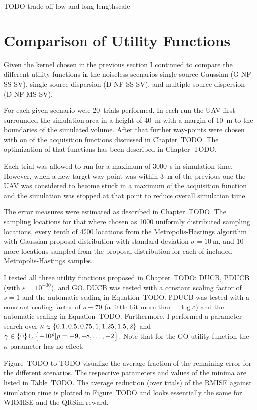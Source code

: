 \documentclass[11pt,a4paper,twoside,BCOR=15mm]{scrreprt}
\begin{document}
TODO trade-off low and long lengthscale

\section{Comparison of Utility Functions} \label{sec:cmputility}
Given the kernel chosen in the previous section I continued to compare the 
different utility functions in the noiseless scenarios single source Gaussian 
(G-NF-SS-SV), single source dispersion (D-NF-SS-SV), and multiple source 
dispersion (D-NF-MS-SV).

For each given scenario were 20~trials performed. In each run the UAV first 
surrounded the simulation area in a height of \SI{40}{\meter} with a margin of 
\SI{10}{\meter} to the boundaries of the simulated volume. After that further 
way-points were chosen with on of the acquisition functions discussed in 
Chapter~TODO\@. The optimization of that functions has been described in 
Chapter~TODO\@.

Each trial was allowed to run for a maximum of \SI{3000}{\second} in simulation 
time. However, when a new target way-point was within \SI{3}{\meter} of the 
previous one the UAV was considered to become stuck in a maximum of the 
acquisition function and the simulation was stopped at that point to reduce 
overall simulation time.

The error measures were estimated as described in Chapter~TODO\@. The sampling 
locations for that where chosen as 1000 uniformly distributed sampling 
locations, every tenth of 4200 locations from the Metropolis-Hastings algorithm 
with Gaussian proposal distribution with standard deviation $\sigma 
= \SI{10}{\meter}$, and 10 more locations sampled from the proposal distribution 
for each of included Metropolis-Hastings samples.

I tested all three utility functions proposed in Chapter~TODO\@: DUCB, PDUCB 
(with $\varepsilon = 10^{-30}$), and GO\@. DUCB was tested with a constant 
scaling factor of $s = 1$ and the automatic scaling in Equation~TODO\@. PDUCB 
was tested with a constant scaling factor of $s = 70$ (a little bit more than 
$-\log \varepsilon$) and the automatic scaling in Equation~TODO\@.  Furthermore, 
I performed a parameter search over $\kappa \in \cbr{0.1, 0.5, 
0.75, 1, 1.25, 1.5, 2}$ and $\gamma \in \cbr{0} \cup \cbr{-10^p | p = -9, -8, 
  \dots, -2}$. Note that for the GO utility function the $\kappa$ parameter has 
no effect.

Figure~TODO to TODO visualize the average fraction of the remaining error for 
the different scenarios. The respective parameters and values of the minima are 
listed in Table~TODO\@. The average reduction (over trials) of the RMISE against 
simulation time is plotted in Figure~TODO and looks essentially the same for 
WRMISE and the QRSim reward.
\end{document}
